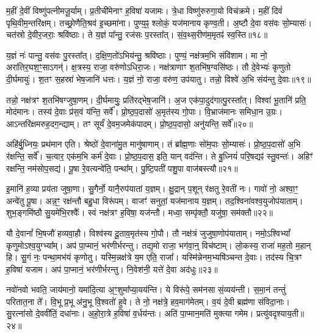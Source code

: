 म॒हीं दे॒वीं विष्णु॑पत्नीमजू॒र्याम्।
प्र॒तीची॑मेनाꣳ ह॒विषा॑ यजामः।
त्रे॒धा विष्णु॑रुरुगा॒यो विच॑क्रमे।
म॒हीं दिवं॑ पृथि॒वीम॒न्तरि॑क्षम्।
तच्छ्रो॒णैति॒श्रव॑ इ॒च्छमा॑ना।
पुण्य॒ꣴ॒ श्लोकं॒ यज॑मानाय कृण्व॒ती।
अ॒ष्टौ दे॒वा वस॑वः सो॒म्यासः॑।
चत॑स्रो दे॒वीर॒जराः॒ श्रवि॑ष्ठाः।
ते य॒ज्ञं पा᳚न्तु॒ रज॑सः प॒रस्ता᳚त्।
सं॒व॒थ्स॒रीण॑म॒मृतꣴ॑ स्व॒स्ति॥१८॥

य॒ज्ञं नः॑ पान्तु॒ वस॑वः पु॒रस्ता᳚त्।
द॒क्षि॒ण॒तो॑\-ऽभिय॑न्तु॒ श्रवि॑ष्ठाः।
पुण्यं॒ नक्ष॑त्रम॒भि संवि॑शाम।
मा नो॒ अरा॑तिर॒घश॒ꣳ॒सा\-ऽगन्॑।
क्ष॒त्रस्य॒ राजा॒ वरु॑णो\-ऽधिरा॒जः।
नक्ष॑त्राणाꣳ श॒तभि॑ष॒ग्वसि॑ष्ठः।
तौ दे॒वेभ्यः॑ कृणुतो दी॒र्घमायुः॑।
श॒तꣳ स॒हस्रा॑ भेष॒जानि॑ धत्तः।
य॒ज्ञं नो॒ राजा॒ वरु॑ण॒ उप॑यातु।
तन्नो॒ विश्वे॑ अ॒भि संय॑न्तु दे॒वाः॥१९॥

तन्नो॒ नक्ष॑त्रꣳ श॒तभि॑षग्जुषा॒णम्।
दी॒र्घमायुः॒ प्रति॑\-रद्भेष॒जानि॑।
अ॒ज एक॑पा॒दुद॑गात्पु॒रस्ता᳚त्।
विश्वा॑ भू॒तानि॑ प्रति॒ मोद॑मानः।
तस्य॑ दे॒वाः प्र॑स॒वं य॑न्ति॒ सर्वे᳚।
प्रो॒ष्ठ॒प॒दासो॑ अ॒मृत॑स्य गो॒पाः।
वि॒भ्राज॑मानः समिधा॒न उ॒ग्रः।
आऽन्तरि॑क्षमरुह॒दग॒न्द्याम्।
तꣳ सूर्यं॑ दे॒वम॒जमेक॑पादम्।
प्रो॒ष्ठ॒प॒दासो॒ अनु॑यन्ति॒ सर्वे᳚॥२०॥

अहि॑र्बु॒ध्नियः॒ प्रथ॑मान एति।
श्रेष्ठो॑ दे॒वाना॑मु॒त मानु॑षाणाम्।
तं ब्रा᳚ह्म॒णाः सो॑म॒पाः सो॒म्यासः॑।
प्रो॒ष्ठ॒प॒दासो॑ अ॒भि र॑क्षन्ति॒ सर्वे᳚।
च॒त्वार॒ एक॑म॒भि कर्म॑ दे॒वाः।
प्रो॒ष्ठ॒प॒दास॒ इति॒ यान् वद॑न्ति।
ते बु॒ध्नियं॑ परि॒षद्यꣴ॑ स्तु॒वन्तः॑।
अहिꣳ॑ रक्षन्ति॒ नम॑सोप॒सद्य॑।
पू॒षा रे॒वत्यन्वे॑ति॒ पन्था᳚म्।
पु॒ष्टि॒पती॑ पशु॒पा वाज॑बस्त्यौ॥२१॥

इ॒मानि॑ ह॒व्या प्रय॑ता जुषा॒णा।
सु॒गैर्नो॒ यानै॒रुप॑यातां य॒ज्ञम्।
क्षु॒द्रान् प॒शून् र॑क्षतु रे॒वती॑ नः।
गावो॑ नो॒ अश्वा॒ꣳ॒ अन्वे॑तु पू॒षा।
अन्न॒ꣳ॒ रक्ष॑न्तौ बहु॒धा विरू॑पम्।
वाजꣳ॑ सनुतां॒ यज॑मानाय य॒ज्ञम्।
तद॒श्विना॑वश्व॒युजोप॑याताम्।
शुभ॒ङ्गमि॑ष्ठौ सु॒यमे॑भि॒रश्वैः᳚।
स्वं नक्ष॑त्रꣳ ह॒विषा॒ यज॑न्तौ।
मध्वा॒ सम्पृ॑क्तौ॒ यजु॑षा॒ सम॑क्तौ॥२२॥

यौ दे॒वानां᳚ भि॒षजौ॑ हव्यवा॒हौ।
विश्व॑स्य दू॒ताव॒मृत॑स्य गो॒पौ।
तौ नक्ष॑त्रं जुजुषा॒णोप॑याताम्।
नमो॒ऽश्विभ्यां᳚ कृणुमो\-ऽश्व॒युग्भ्या᳚म्।
अप॑ पा॒प्मानं॒ भर॑णीर्भरन्तु।
तद्य॒मो राजा॒ भग॑वा॒न्॒ विच॑ष्टाम्।
लो॒कस्य॒ राजा॑ मह॒तो म॒हान् हि।
सु॒गं नः॒ पन्था॒मभ॑यं कृणोतु।
यस्मि॒न्नक्ष॑त्रे य॒म एति॒ राजा᳚।
यस्मि॑न्नेनम॒भ्यषि॑ञ्चन्त दे॒वाः।
तद॑स्य चि॒त्रꣳ ह॒विषा॑ यजाम।
अप॑ पा॒प्मानं॒ भर॑णीर्भरन्तु।
नि॒वेश॑नी॒ यत्ते॑ दे॒वा अद॑धुः॥२३॥\anuvakamend[त॒तार॒ मह्यं॑ प्रास॒चीर्या या᳚न्तु य॒ज्ञं वाचꣴ॑ स्व॒स्ति दे॒वा अनु॑यन्ति॒ सर्वे॒ वाज॑बस्त्यौ॒ सम॑क्तौ दे॒वास्त्रीणि॑ च]

नवो॑नवो भवति॒ जाय॑मानो॒ यमा॑दि॒त्या अ॒ꣳ॒शुमा᳚प्या॒यय॑न्ति।
ये विरू॑पे॒ सम॑नसा सं॒व्यय॑न्ती।
स॒मा॒नं तन्तुं॑ परितात॒ना ते᳚।
वि॒भू प्र॒भू अ॑नु॒भू वि॒श्वतो॑ हुवे।
ते नो॒ नक्ष॑त्रे॒ हव॒माग॑मेतम्।
व॒यं दे॒वी ब्रह्म॑णा संविदा॒नाः।
सु॒रत्ना॑सो दे॒ववी॑तिं॒ दधा॑नाः।
अ॒हो॒रा॒त्रे ह॒विषा॑ व॒र्धय॑न्तः।
अति॑ पा॒प्मान॒मति॑ मुक्त्या गमेम।
प्रत्यु॑वदृश्याय॒ती॥२४॥

